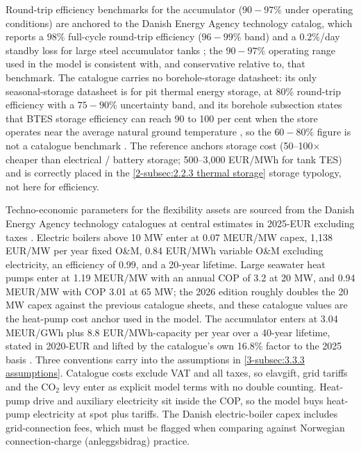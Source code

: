 
Round-trip efficiency benchmarks for the accumulator ($90-97\%$ under operating conditions) are anchored to the Danish Energy Agency technology catalog, which reports a $98\%$ full-cycle round-trip efficiency ($96-99\%$ band) and a $0.2\%$/day standby loss for large steel accumulator tanks \cite{danish_energy_agency_energy_2025}; the $90-97\%$ operating range used in the model is consistent with, and conservative relative to, that benchmark. The catalogue carries no borehole-storage datasheet: its only seasonal-storage datasheet is for pit thermal energy storage, at $80\%$ round-trip efficiency with a $75-90\%$ uncertainty band, and its borehole subsection states that BTES storage efficiency can reach 90 to 100 per cent when the store operates near the average natural ground temperature \cite{danish_energy_agency_energy_2025}, so the $60-80\%$ figure is not a catalogue benchmark . The \cite{hennessy_flexibility_2019} reference anchors storage cost (50–100× cheaper than electrical / battery storage;  500–3,000 EUR/MWh for tank TES) and is correctly placed in the \autoref{2-subsec:2.2.3 thermal storage} storage typology, not here for efficiency.

Techno-economic parameters for the flexibility assets are sourced from the Danish Energy Agency technology catalogues at central estimates in 2025-EUR excluding taxes \cite{danish_energy_agency_technology_2024}. Electric boilers above 10 MW enter at 0.07 MEUR/MW capex, 1,138 EUR/MW per year fixed O\&M, 0.84 EUR/MWh variable O\&M excluding electricity, an efficiency of 0.99, and a 20-year lifetime. Large seawater heat pumps enter at 1.19 MEUR/MW with an annual COP of 3.2 at 20 MW, and 0.94 MEUR/MW with COP 3.01 at 65 MW; the 2026 edition roughly doubles the 20 MW capex against the previous catalogue sheets, and these catalogue values are the heat-pump cost anchor used in the model. The accumulator enters at 3.04 MEUR/GWh plus 8.8 EUR/MWh-capacity per year over a 40-year lifetime, stated in 2020-EUR and lifted by the catalogue's own 16.8\% factor to the 2025 basis \cite{danish_energy_agency_energy_2025}. Three conventions carry into the assumptions in \autoref{3-subsec:3.3.3 assumptions}. Catalogue costs exclude VAT and all taxes, so elavgift, grid tariffs and the CO$_2$ levy enter as explicit model terms with no double counting. Heat-pump drive and auxiliary electricity sit inside the COP, so the model buys heat-pump electricity at spot plus tariffs. The Danish electric-boiler capex includes grid-connection fees, which must be flagged when comparing against Norwegian connection-charge (anleggsbidrag) practice.

